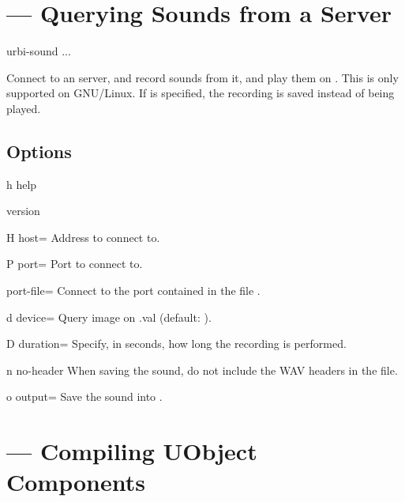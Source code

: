 \section{ --- Querying Sounds from a Server}
\label{sec:tools:urbi-sound}

\begin{shell}
urbi-sound ...
\end{shell}

Connect to an \urbi server, and record sounds from it, and play them on
.  This is only supported on GNU/Linux.  If
 is specified, the recording is saved instead of being
played.

\subsection{Options}

\begin{options}
\item[h]{help} \optionHelp
\item{version} \optionVersion
\end{options}

\begin{options}[Networking]
\item[H]{host=} Address to connect to.
\item[P]{port=} Port to connect to.
\item{port-file=} Connect to the port contained in the file
  .
\end{options}

\begin{options}[Tuning]
\item[d]{device=} Query image on .val
  (default: ).
\item[D]{duration=} Specify, in seconds, how long the
  recording is performed.
\item[n]{no-header} When saving the sound, do not include the WAV headers in
  the file.
\item[o]{output=} Save the sound into .
\end{options}


\section{ --- Compiling UObject Components}
\label{sec:tools:umake}


